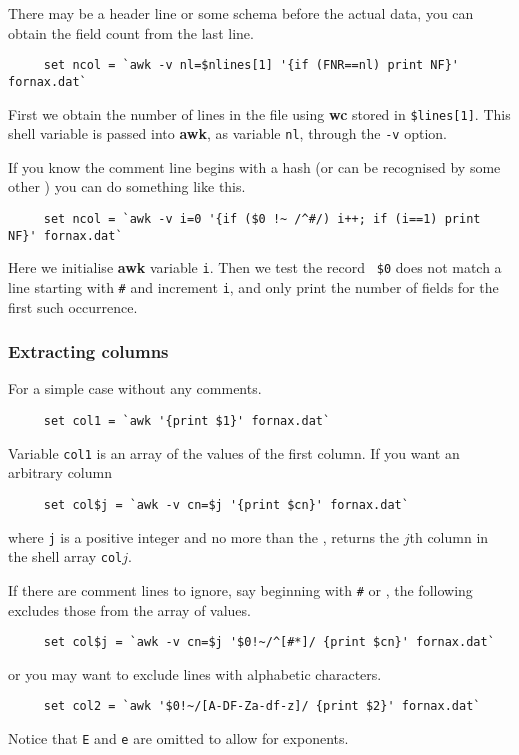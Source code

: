 There may be a header line or some schema before the actual data, you
can obtain the field count from the last line.
\small
\begin{verbatim}
     set ncol = `awk -v nl=$nlines[1] '{if (FNR==nl) print NF}' fornax.dat`
\end{verbatim}
\normalsize
First we obtain the number of lines in the file using {\bf wc} stored
in {\tt \$lines[1]}.  This shell variable is passed into {\bf awk}, as 
variable {\tt nl}, through the {\tt -v} option.

If you know the comment line begins with a hash (or can be recognised
by some other ) you
can do something like this.
\small
\begin{verbatim}
     set ncol = `awk -v i=0 '{if ($0 !~ /^#/) i++; if (i==1) print NF}' fornax.dat`
\end{verbatim}
\normalsize
Here we initialise {\bf awk} variable {\tt i}.  Then we test the record {\tt
\$0} does not match a line starting with {\tt \#} and increment {\tt i},
and only print the number of fields for the first such occurrence.


\subsubsection{Extracting columns}

For a simple case without any comments.
\small
\begin{verbatim}
     set col1 = `awk '{print $1}' fornax.dat`
\end{verbatim}
\normalsize
Variable {\tt col1} is an array of the values of the first column.  If
you want an arbitrary column
\small
\begin{verbatim}
     set col$j = `awk -v cn=$j '{print $cn}' fornax.dat`
\end{verbatim}
\normalsize
where  {\tt j} is a positive
integer and no more than the , returns the $j$th column in the shell array
{\tt col}$j$.

If there are comment lines to ignore, say beginning with {\tt \#} or
{\tt *}, the following excludes those from the array of values.
\small
\begin{verbatim}
     set col$j = `awk -v cn=$j '$0!~/^[#*]/ {print $cn}' fornax.dat`
\end{verbatim}
\normalsize
or you may want to exclude lines with alphabetic characters.
\small
\begin{verbatim}
     set col2 = `awk '$0!~/[A-DF-Za-df-z]/ {print $2}' fornax.dat`
\end{verbatim}
\normalsize
Notice that {\tt E} and {\tt e} are omitted to allow for exponents.

